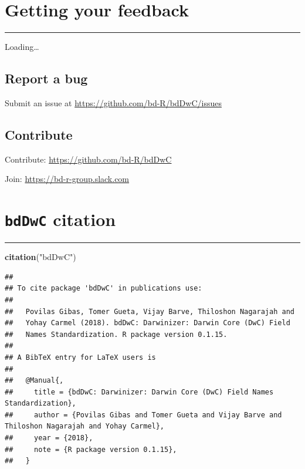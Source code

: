 \documentclass[]{book}
\newenvironment{Shaded}{\begin{snugshade}}{\end{snugshade}}
\newcommand{\KeywordTok}[1]{\textcolor[rgb]{0.13,0.29,0.53}{\textbf{#1}}}
\newcommand{\StringTok}[1]{\textcolor[rgb]{0.31,0.60,0.02}{#1}}
\newcommand{\NormalTok}[1]{#1}
\theoremstyle{definition}
\theoremstyle{definition}
\theoremstyle{definition}
\theoremstyle{remark}
\begin{document}
\chapter{Getting your feedback}\label{getting-your-feedback}

\begin{center}\rule{0.5\linewidth}{\linethickness}\end{center}

Loading\ldots{}

\section{Report a bug}\label{report-a-bug}

Submit an issue at \url{https://github.com/bd-R/bdDwC/issues}

\section{Contribute}\label{contribute}

Contribute: \url{https://github.com/bd-R/bdDwC}

Join: \url{https://bd-r-group.slack.com}

\chapter{\texorpdfstring{\texttt{bdDwC}
citation}{bdDwC citation}}\label{bddwc-citation}

\begin{center}\rule{0.5\linewidth}{\linethickness}\end{center}

\begin{Shaded}
\begin{Highlighting}[]
\KeywordTok{citation}\NormalTok{(}\StringTok{"bdDwC"}\NormalTok{)}
\end{Highlighting}
\end{Shaded}

\begin{verbatim}
## 
## To cite package 'bdDwC' in publications use:
## 
##   Povilas Gibas, Tomer Gueta, Vijay Barve, Thiloshon Nagarajah and
##   Yohay Carmel (2018). bdDwC: Darwinizer: Darwin Core (DwC) Field
##   Names Standardization. R package version 0.1.15.
## 
## A BibTeX entry for LaTeX users is
## 
##   @Manual{,
##     title = {bdDwC: Darwinizer: Darwin Core (DwC) Field Names Standardization},
##     author = {Povilas Gibas and Tomer Gueta and Vijay Barve and Thiloshon Nagarajah and Yohay Carmel},
##     year = {2018},
##     note = {R package version 0.1.15},
##   }
\end{verbatim}
\end{document}
